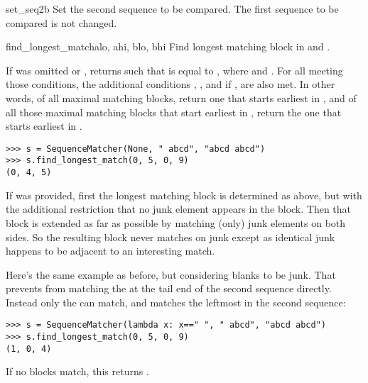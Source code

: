 \begin{methoddesc}{set_seq2}{b}
  Set the second sequence to be compared.  The first sequence to be
  compared is not changed.
\end{methoddesc}

\begin{methoddesc}{find_longest_match}{alo, ahi, blo, bhi}
  Find longest matching block in 
  and .

  If  was omitted or ,
   returns  such that  is equal
  to , where
       and
      .
  For all  meeting those
  conditions, the additional conditions
      ,
      ,
      and if , 
  are also met.
  In other words, of all maximal matching blocks, return one that
  starts earliest in , and of all those maximal matching blocks
  that start earliest in , return the one that starts earliest
  in .

\begin{verbatim}
>>> s = SequenceMatcher(None, " abcd", "abcd abcd")
>>> s.find_longest_match(0, 5, 0, 9)
(0, 4, 5)
\end{verbatim}

  If  was provided, first the longest matching block is
  determined as above, but with the additional restriction that no
  junk element appears in the block.  Then that block is extended as
  far as possible by matching (only) junk elements on both sides.
  So the resulting block never matches on junk except as identical
  junk happens to be adjacent to an interesting match.

  Here's the same example as before, but considering blanks to be junk.
  That prevents  from matching the  at the
  tail end of the second sequence directly.  Instead only the
   can match, and matches the leftmost  in
  the second sequence:

\begin{verbatim}
>>> s = SequenceMatcher(lambda x: x==" ", " abcd", "abcd abcd")
>>> s.find_longest_match(0, 5, 0, 9)
(1, 0, 4)
\end{verbatim}

  If no blocks match, this returns .
\end{methoddesc}

